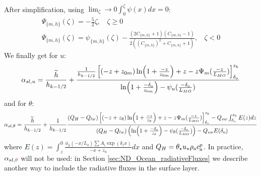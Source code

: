 \begin{subappendices}
\begin{equation}
\begin{aligned}
\end{aligned}
\end{equation}
After simplification, using $\lim_\zeta\to0 \int_0^\zeta\psi(x)dx = 0$:
\begin{equation}
\begin{aligned}
\Psi_{\{m,h\}}(\zeta)= -\frac{5}{2}\zeta, ~~~~ \zeta \geq 0 \\
	\Psi_{\{m,h\}}(\zeta)=
	\psi_{\{m,h\}}(\zeta)
	- \frac{(2C_{\{m,h\}}+1)(C_{\{m,h\}} - 1)}
	{2\left((C_{\{m,h\}})^2 + C_{\{m,h\}} + 1\right)}, ~~~~ \zeta < 0
\end{aligned}
\end{equation}
We finally get for $u$:
\begin{equation}
	\alpha_{sl, u} = \frac{\widetilde{h}}{h_{k-1/2}} +
	\frac{\frac{1}{{h_{k-1/2}}}
    \left[
	    (-z+z_{0m})\ln(1+\frac{-z}{z_{0m}})+z
    -
    z \Psi_m(\frac{-z}{L_{MO}}) \right]_{\delta_{\rm o}}^{z_k}
    }{\ln(1+\frac{-\delta_{\rm o}}{z_{0m}})- \psi_u(\frac{-\delta_{\rm o}}{L_{MO}})
    }
\end{equation}
and for $\theta$:
\begin{equation}
	\alpha_{sl, \theta} =  \frac{\widetilde{h}}{h_{k-1/2}} +
	\frac{1}{{h_{k-1/2}}}\frac{(Q_H -
		Q_{lw})
    \left[
	    (-z+z_{\theta})\ln(1+\frac{-z}{z_{\theta}})+z
    -
    z \Psi_m(\frac{-z}{L_{MO}}) \right]_{\delta_{\rm o}}^{z_k}
	- Q_{sw} \int_{\delta_o}^{z_k}
		E(z) dz
    }{(Q_H - Q_{lw})
	    \left(\ln(1+\frac{-\delta_{\rm o}}{z_{\theta}})-
	    \psi_\theta(\frac{-\delta_{\rm o}}{L_{MO}})\right)
	    -Q_{sw} E(\delta_{\rm o})
    }
\end{equation}
where $E(z) = \int_{z}^0 \frac{\phi_h(-x/L_o)
		\sum A_i \exp (k_i x)
		}{-x + z_{u}}dx$
and $Q_H = \theta_\star u_\star \rho_{\rm a} c_{\rm a}^p$.
In practice, $\alpha_{sl, \emphase{\theta}}$ will not be used: in Section
\ref{sec:ND_Ocean_radiativeFluxes} we describe another way to
include the radiative fluxes in the surface layer.
\end{subappendices}
